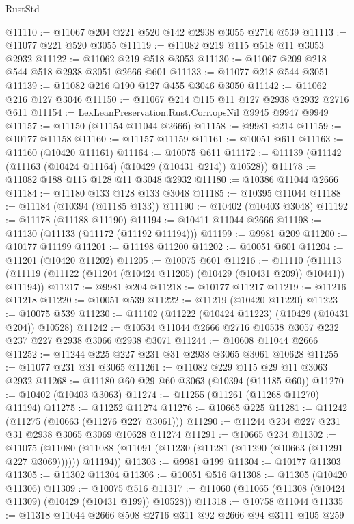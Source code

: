 \begin{lexlean}{RustStd}
\begin{coremodule}
{\begin{coremodule}
{{{{{{{{{{{{{{{{{{{{{{{{{{{{{{{{{{{{{{{{{{{{{{{{{{{{{{{{{{{{{{{{{{{{{{{{{{{{{{@11110 := @11067 @204 @221 @520 @142 @2938 @3055 @2716 @539
@11113 := @11077 @221 @520 @3055
@11119 := @11082 @219 @115 @518 @11 @3053 @2932
@11122 := @11062 @219 @518 @3053
@11130 := @11067 @209 @218 @544 @518 @2938 @3051 @2666 @601
@11133 := @11077 @218 @544 @3051
@11139 := @11082 @216 @190 @127 @455 @3046 @3050
@11142 := @11062 @216 @127 @3046
@11150 := @11067 @214 @115 @11 @127 @2938 @2932 @2716 @611
@11154 := LexLeanPreservation.Rust.Corr.opsNil @9945 @9947 @9949
@11157 := @11150 (@11154 @11044 @2666)
@11158 := @9981 @214
@11159 := @10177 @11158
@11160 := @11157 @11159
@11161 := @10051 @611
@11163 := @11160 (@10420 @11161)
@11164 := @10075 @611
@11172 := @11139 (@11142 (@11163 (@10424 @11164) (@10429 (@10431 @214)) @10528))
@11178 := @11082 @188 @115 @128 @11 @3048 @2932
@11180 := @10386 @11044 @2666
@11184 := @11180 @133 @128 @133 @3048
@11185 := @10395 @11044
@11188 := @11184 (@10394 (@11185 @133))
@11190 := @10402 (@10403 @3048)
@11192 := @11178 (@11188 @11190)
@11194 := @10411 @11044 @2666
@11198 := @11130 (@11133 (@11172 (@11192 @11194)))
@11199 := @9981 @209
@11200 := @10177 @11199
@11201 := @11198 @11200
@11202 := @10051 @601
@11204 := @11201 (@10420 @11202)
@11205 := @10075 @601
@11216 := @11110
    (@11113 (@11119 (@11122 (@11204 (@10424 @11205) (@10429 (@10431 @209)) @10441)) @11194))
@11217 := @9981 @204
@11218 := @10177 @11217
@11219 := @11216 @11218
@11220 := @10051 @539
@11222 := @11219 (@10420 @11220)
@11223 := @10075 @539
@11230 := @11102 (@11222 (@10424 @11223) (@10429 (@10431 @204)) @10528)
@11242 := @10534 @11044 @2666 @2716 @10538 @3057 @232 @237 @227 @2938 @3066 @2938 @3071
@11244 := @10608 @11044 @2666
@11252 := @11244 @225 @227 @231 @31 @2938 @3065 @3061 @10628
@11255 := @11077 @231 @31 @3065
@11261 := @11082 @229 @115 @29 @11 @3063 @2932
@11268 := @11180 @60 @29 @60 @3063 (@10394 (@11185 @60))
@11270 := @10402 (@10403 @3063)
@11274 := @11255 (@11261 (@11268 @11270) @11194)
@11275 := @11252 @11274
@11276 := @10665 @225
@11281 := @11242 (@11275 (@10663 (@11276 @227 @3061)))
@11290 := @11244 @234 @227 @231 @31 @2938 @3065 @3069 @10628 @11274
@11291 := @10665 @234
@11302 := @11075
    (@11080 (@11088 (@11091 (@11230 (@11281 (@11290 (@10663 (@11291 @227 @3069)))))) @11194))
@11303 := @9981 @199
@11304 := @10177 @11303
@11305 := @11302 @11304
@11306 := @10051 @516
@11308 := @11305 (@10420 @11306)
@11309 := @10075 @516
@11317 := @11060 (@11065 (@11308 (@10424 @11309) (@10429 (@10431 @199)) @10528))
@11318 := @10758 @11044
@11335 := @11318
    @11044
    @2666
    @508
    @2716
    @311
    @92
    @2666
    @94
    @3111
    @105
    @259
}}}}}}}}}}}}}}}}}}}}}}}}}}}}}}}}}}}}}}}}}}}}}}}}}}}}}}}}}}}}}}}}}}}}}}}}}}}}}}
\end{coremodule}}
\end{coremodule}
\end{lexlean}
